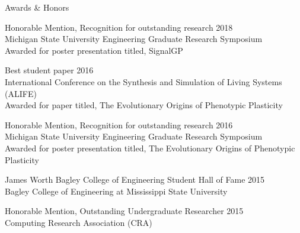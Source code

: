 \begin{rSection}{Awards \& Honors}

Honorable Mention, Recognition for outstanding research \hfill 2018 \\
\tab Michigan State University Engineering Graduate Research Symposium \\
\tab Awarded for poster presentation titled, SignalGP

Best student paper \hfill 2016 \\
 International Conference on the Synthesis and Simulation of Living Systems (ALIFE) \\
\tab Awarded for paper titled, The Evolutionary Origins of Phenotypic Plasticity

Honorable Mention, Recognition for outstanding research \hfill 2016 \\
\tab Michigan State University Engineering Graduate Research Symposium \\
\tab Awarded for poster presentation titled, The Evolutionary Origins of Phenotypic Plasticity

James Worth Bagley College of Engineering Student Hall of Fame \hfill 2015 \\
\tab Bagley College of Engineering at Mississippi State University

Honorable Mention, Outstanding Undergraduate Researcher  \hfill 2015 \\
\tab Computing Research Association (CRA)

\end{rSection}